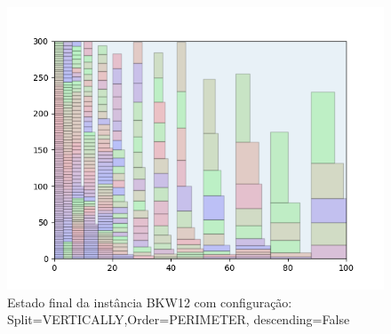 \begin{figure}[H]
    \centering
    \caption[]{Estado final da instância BKW12 com configuração: Split=VERTICALLY,Order=PERIMETER, descending=False}
    \label{fig:bkw12-vertically-perimeter-false}
    \includegraphics[scale=0.5]{output/figures/bkw/bkw12/vertically/perimeter/false/000}
\end{figure}